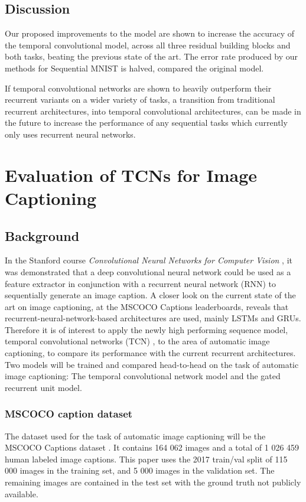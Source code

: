 \documentclass[a4paper, twoside]{article}
\begin{document}
\subsection{Discussion}
Our proposed improvements to the model are shown to increase the accuracy of the temporal convolutional model, across all three residual building blocks and both tasks, beating the previous state of the art. The error rate produced by our methods for Sequential MNIST is halved, compared the original model.

If temporal convolutional networks are shown to heavily outperform their recurrent variants on a wider variety of tasks, a transition from traditional recurrent architectures, into temporal convolutional architectures, can be made in the future to increase the performance of any sequential tasks which currently only uses recurrent neural networks.

\section{Evaluation of TCNs for Image Captioning}
\subsection{Background}
In the Stanford course \textit{Convolutional Neural Networks for Computer Vision} \cite{cs231n}, it was demonstrated that a deep convolutional neural network could be used as a feature extractor in conjunction with a recurrent neural network (RNN) to sequentially generate an image caption. A closer look on the current state of the art on image captioning, at the MSCOCO \cite{mscoco} Captions leaderboards, reveals that recurrent-neural-network-based architectures are used, mainly LSTMs and GRUs. Therefore it is of interest to apply the newly high performing sequence model, temporal convolutional networks (TCN) \cite{tcn}, to the area of automatic image captioning, to compare its performance with the current recurrent architectures. Two models will be trained and compared head-to-head on the task of automatic image captioning: The temporal convolutional network model and the gated recurrent unit model.

\subsubsection{MSCOCO caption dataset}
The dataset used for the task of automatic image captioning will be the MSCOCO Captions dataset \cite{mscoco}. It contains 164 062 images and a total of 1 026 459 human labeled image captions. This paper uses the 2017 train/val split of 115 000 images in the training set, and 5 000 images in the validation set. The remaining images are contained in the test set with the ground truth not publicly available.
\end{document}
